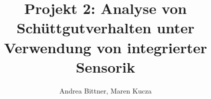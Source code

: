 \documentclass[cover]{isas-seminar}
\title{Projekt 2: Analyse von Schüttgutverhalten unter Verwendung von integrierter Sensorik}
\author{Andrea Bittner, Maren Kucza}
\begin{document}
\maketitle

\begin{abstract}
\end{abstract}
\clearpage
\tableofcontents
\cleardoublepage




\end{document}
